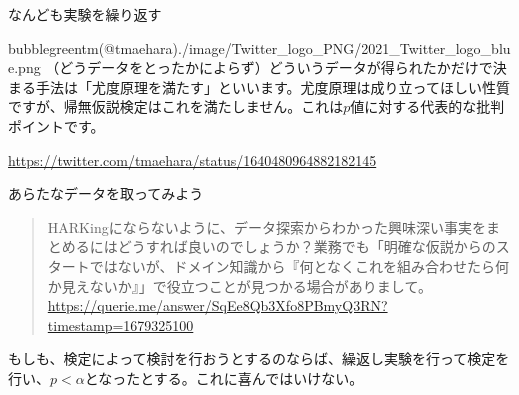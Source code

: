 \begin{SMbox}{なんども実験を繰り返す}
\begin{rightbubbles}{bubblegreen}{tm(@tmaehara)}{./image/Twitter_logo_PNG/2021_Twitter_logo_blue.png}
  （どうデータをとったかによらず）どういうデータが得られたかだけで決まる手法は「尤度原理を満たす」といいます。尤度原理は成り立ってほしい性質ですが、帰無仮説検定はこれを満たしません。これは$p$値に対する代表的な批判ポイントです。
\begin{flushright} 
\small	\url{https://twitter.com/tmaehara/status/1640480964882182145}
\end{flushright}    
\end{rightbubbles}


\end{SMbox}

\begin{SMbox}{あらたなデータを取ってみよう}
  \begin{quote}
    HARKingにならないように、データ探索からわかった興味深い事実をまとめるにはどうすれば良いのでしょうか？業務でも「明確な仮説からのスタートではないが、ドメイン知識から『何となくこれを組み合わせたら何か見えないか』」で役立つことが見つかる場合がありまして。
\\ \url{https://querie.me/answer/SqEe8Qb3Xfo8PBmyQ3RN?timestamp=1679325100}
  \end{quote}
  もしも、検定によって検討を行おうとするのならば、繰返し実験を行って検定を行い、$p<\alpha$となったとする。これに喜んではいけない。
\end{SMbox}



